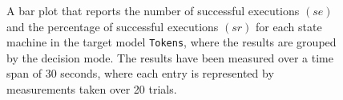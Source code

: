 \begin{figure}[h!]
\centering
\begin{minipage}{1\textwidth}
  \centering
  \makebox[\textwidth][c]{ %
        \resizebox{1.19\textwidth}{!}{ %
            
        }%
    }%
\end{minipage}
\caption{A bar plot that reports the number of successful executions $(se)$ and the percentage of successful executions $(sr)$ for each state machine in the target model \texttt{Tokens}, where the results are grouped by the decision mode. The results have been measured over a time span of 30 seconds, where each entry is represented by measurements taken over 20 trials.}
\label{figure:decision_mode_state_machine_transition_frequency_comparison_tokens}
\end{figure}